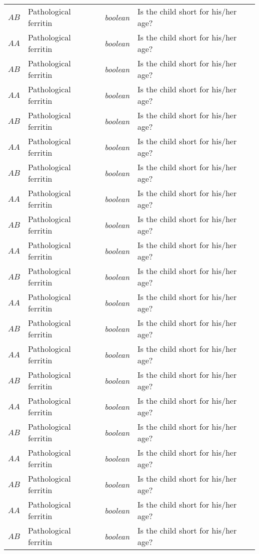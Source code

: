 \begin{footnotesize}
\begin{longtable}{C{.09\mylength} p{.25\mylength} C{.20\mylength} p{.40\mylength}}
	$AB$ & Pathological ferritin & \textit{boolean} & Is the child short for his/her age?\\
	$AA$ & Pathological ferritin & \textit{boolean} & Is the child short for his/her age?\\
	$AB$ & Pathological ferritin & \textit{boolean} & Is the child short for his/her age?\\
	$AA$ & Pathological ferritin & \textit{boolean} & Is the child short for his/her age?\\
	$AB$ & Pathological ferritin & \textit{boolean} & Is the child short for his/her age?\\
	$AA$ & Pathological ferritin & \textit{boolean} & Is the child short for his/her age?\\
	$AB$ & Pathological ferritin & \textit{boolean} & Is the child short for his/her age?\\
	$AA$ & Pathological ferritin & \textit{boolean} & Is the child short for his/her age?\\
	$AB$ & Pathological ferritin & \textit{boolean} & Is the child short for his/her age?\\
	$AA$ & Pathological ferritin & \textit{boolean} & Is the child short for his/her age?\\
	$AB$ & Pathological ferritin & \textit{boolean} & Is the child short for his/her age?\\
	$AA$ & Pathological ferritin & \textit{boolean} & Is the child short for his/her age?\\
	$AB$ & Pathological ferritin & \textit{boolean} & Is the child short for his/her age?\\
	$AA$ & Pathological ferritin & \textit{boolean} & Is the child short for his/her age?\\
	$AB$ & Pathological ferritin & \textit{boolean} & Is the child short for his/her age?\\
	$AA$ & Pathological ferritin & \textit{boolean} & Is the child short for his/her age?\\
	$AB$ & Pathological ferritin & \textit{boolean} & Is the child short for his/her age?\\
	$AA$ & Pathological ferritin & \textit{boolean} & Is the child short for his/her age?\\
	$AB$ & Pathological ferritin & \textit{boolean} & Is the child short for his/her age?\\
	$AA$ & Pathological ferritin & \textit{boolean} & Is the child short for his/her age?\\
	$AB$ & Pathological ferritin & \textit{boolean} & Is the child short for his/her age?\\

\end{longtable}
\end{footnotesize}
